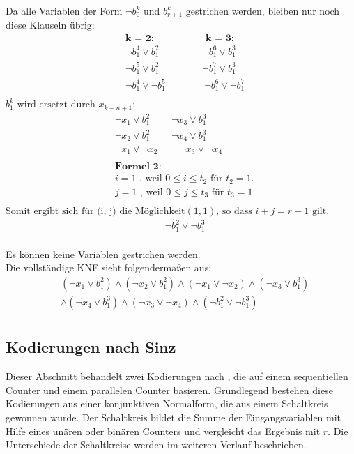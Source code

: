 \documentclass[a4,abstract=on]{scrartcl}
\begin{document}
Da alle Variablen der Form $\neg b_0^k$ und $b_{r+1}^k$  gestrichen werden, bleiben nur noch diese Klauseln übrig:\\
\begin{align*}
&\textbf{k = 2:} {~~~~~~~~~~~~~~~~~~~~~~~~} \textbf{k = 3:}\\
&\neg b_1^4  \vee b_1^2 {~~~~~~~~~~~~~~~~~~~~}\neg b_1^6 \vee b_1^3\\
&\neg b_1^5 \vee b_1^2  {~~~~~~~~~~~~~~~~~~~~}\neg b_1^7 \vee b_1^3\\
&\neg b_1^4 \vee \neg b_1^5 {~~~~~~~~~~~~~~~~~~}\neg b_1^6 \vee \neg b_1^7\\
\end{align*}
$b_1^k \text{ wird ersetzt durch } x_{k-n+1}$:
\begin{align*}
&\neg x_1 \vee b_1^2 {~~~~~~~~~~} \neg x_3 \vee b_1^3\\
&\neg x_2 \vee b_1^2 {~~~~~~~~~~} \neg x_4 \vee b_1^3\\
&\neg x_1 \vee \neg x_2 {~~~~~~~~~~} \neg x_3 \vee \neg x_4\\
\\
&\textbf{Formel 2:}\\
&i=1 \text{ , weil } 0\leq i \leq t_2 \text{ für } t_2 = 1.\\
&j=1 \text{ , weil } 0\leq j \leq t_3 \text{ für } t_3=1.\\
\end{align*}
$\text{Somit ergibt sich für (i, j) die Möglichkeit} (1,1) \text{, }\text{so dass } i+j = r+1 \text{  gilt.}$
\begin{align*}
&\neg b_1^2 \vee \neg b_1^3\\
\end{align*}

Es können keine Variablen gestrichen werden.\\

Die vollständige KNF sieht folgendermaßen aus:\\
\begin{align*}
&(\neg x_1 \vee b_1^2) \wedge (\neg x_2 \vee b_1^2) \wedge (\neg x_1 \vee \neg x_2) \wedge (\neg x_3 \vee b_1^3)\\
&\wedge (\neg x_4 \vee b_1^3) \wedge (\neg x_3 \vee \neg x_4) \wedge (\neg b_1^2 \vee \neg b_1^3)\\
\end{align*}

	\subsection{Kodierungen nach Sinz}
Dieser Abschnitt behandelt zwei Kodierungen nach \cite[][]{sinz}, die auf einem sequentiellen Counter und einem parallelen Counter basieren. Grundlegend bestehen diese Kodierungen aus einer konjunktiven Normalform, die aus einem Schaltkreis gewonnen wurde. Der Schaltkreis bildet die Summe der Eingangsvariablen mit Hilfe eines unären oder binären Counters und vergleicht das Ergebnis mit $r$. Die Unterschiede der Schaltkreise werden im weiteren Verlauf beschrieben.
\end{document}
